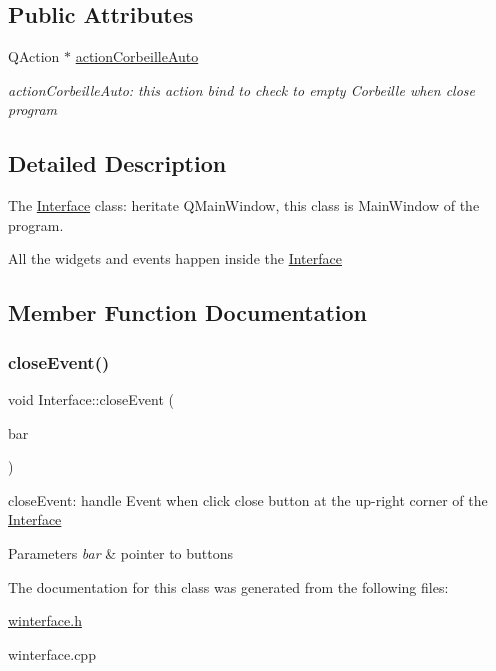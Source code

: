 \subsection*{Public Attributes}
\begin{DoxyCompactItemize}
\item 
\mbox{\label{class_interface_a9ec3b9f9d2f43b773f04f22e49d439a8}} 
Q\+Action $\ast$ \hyperlink{class_interface_a9ec3b9f9d2f43b773f04f22e49d439a8}{action\+Corbeille\+Auto}
\begin{DoxyCompactList}\small\item\em action\+Corbeille\+Auto\+: this action bind to check to empty Corbeille when close program \end{DoxyCompactList}\end{DoxyCompactItemize}


\subsection{Detailed Description}
The \hyperlink{class_interface}{Interface} class\+: heritate Q\+Main\+Window, this class is Main\+Window of the program. 

All the widgets and events happen inside the \hyperlink{class_interface}{Interface} 

\subsection{Member Function Documentation}
\mbox{\label{class_interface_a5e55a321ae0f587fb2c1378aad7536cf}} 
\subsubsection{\texorpdfstring{close\+Event()}{closeEvent()}}
{\footnotesize\ttfamily void Interface\+::close\+Event (\begin{DoxyParamCaption}\item[{Q\+Close\+Event $\ast$}]{bar }\end{DoxyParamCaption})}



close\+Event\+: handle Event when click close button at the up-\/right corner of the \hyperlink{class_interface}{Interface} 


\begin{DoxyParams}{Parameters}
{\em bar} & pointer to buttons \\
\hline
\end{DoxyParams}


The documentation for this class was generated from the following files\+:\begin{DoxyCompactItemize}
\item 
\hyperlink{winterface_8h}{winterface.\+h}\item 
winterface.\+cpp\end{DoxyCompactItemize}
